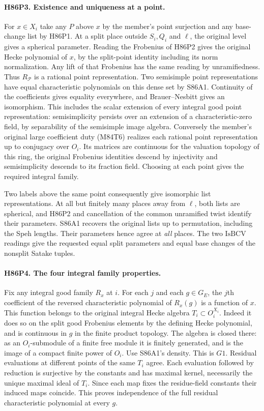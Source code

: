\paragraph{H86P3. Existence and uniqueness at a point.}
For $x\in X_i$ take any $P$ above $x$ by the member's point
surjection and any base-change list by H86P1. At a split place
outside $S_i,Q_i$ and $\ell$, the original level gives a spherical
parameter. Reading the Frobenius of H86P2 gives the original Hecke
polynomial of $x$, by the split-point identity including its norm
normalization. Any lift of that Frobenius has the same reading by
unramifiedness. Thus $R_{\mathcal P}$ is a rational point
representation. Two semisimple point representations have equal
characteristic polynomials on this dense set by S86A1. Continuity
of the coefficients gives equality everywhere, and Brauer--Nesbitt
gives an isomorphism. This includes the scalar extension of every
integral good point representation: semisimplicity persists over
an extension of a characteristic-zero field, by separability of the
semisimple image algebra. Conversely the member's original large
coefficient duty (M84T6) realizes each rational point representation
up to conjugacy over $O_i$. Its matrices are continuous for the
valuation topology of this ring, the original Frobenius identities
descend by injectivity and semisimplicity descends to its fraction
field. Choosing at each point gives the required integral family.

Two labels above the same point consequently give isomorphic list
representations. At all but finitely many places away from $\ell$,
both lists are spherical, and H86P2 and cancellation of the common
unramified twist identify their parameters. S86A1 recovers the
original lists up to permutation, including the Speh lengths.
Their parameters hence agree at \emph{all} places. The two
$\mathrm{IsBCV}$ readings give the requested equal split parameters
and equal base changes of the nonsplit Satake tuples.

\paragraph{H86P4. The four integral family properties.}
Fix any integral good family $R_x$ at $i$. For each $j$ and each
$g\in G_E$, the $j$th coefficient of the reversed characteristic
polynomial of $R_x(g)$ is a function of $x$. This function belongs to
the original integral Hecke algebra $T_i\subset O_i^{X_i}$.
Indeed it does so on the split good Frobenius elements by the
defining Hecke polynomial, and is continuous in $g$ in the finite
product topology. The algebra is closed there: as an $O_i$-submodule
of a finite free module it is finitely generated, and is the image
of a compact finite power of $O_i$. Use S86A1's density. This is
$G1$. Residual evaluations at different points of the same $T_i$
agree. Each evaluation followed by reduction is surjective by the
constants and has maximal kernel, necessarily the unique maximal
ideal of $T_i$. Since each map fixes the residue-field constants
their induced maps coincide. This proves independence of the full
residual characteristic polynomial at every $g$.

